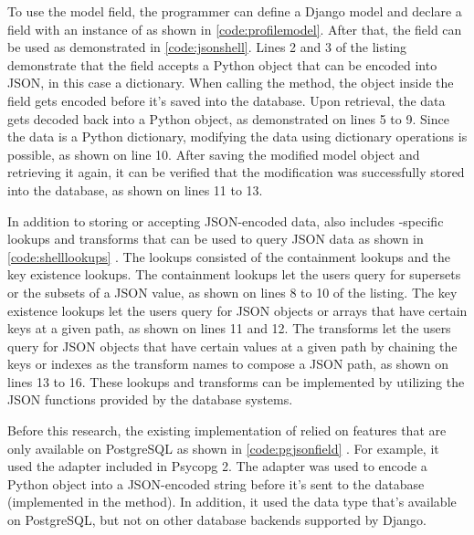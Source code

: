 To use the  model field, the programmer can define a Django
model and declare a field with an instance of  as shown in
\autoref{code:profilemodel}. After that, the field can be used as demonstrated
in \autoref{code:jsonshell}. Lines 2 and 3 of the listing demonstrate that the
field accepts a Python object that can be encoded into JSON, in this case a
dictionary. When calling the  method, the object inside the
field gets encoded before it's saved into the database. Upon retrieval, the
data gets decoded back into a Python object, as demonstrated on lines 5 to 9.
Since the data is a Python dictionary, modifying the data using dictionary
operations is possible, as shown on line 10. After saving the modified model
object and retrieving it again, it can be verified that the modification was
successfully stored into the database, as shown on lines 11 to 13.

\noindent
\begin{minipage}{\linewidth}

\end{minipage}

In addition to storing or accepting JSON-encoded data,  also
includes -specific lookups and transforms that can be used to
query JSON data as shown in \autoref{code:shelllookups}
\cite{django30_modeljsonfield}. The lookups consisted of the containment
lookups and the key existence lookups. The containment lookups let the users
query for supersets or the subsets of a JSON value, as shown on lines 8 to 10
of the listing. The key existence lookups let the users query for JSON objects
or arrays that have certain keys at a given path, as shown on lines 11 and 12.
The transforms let the users query for JSON objects that have certain values at
a given path by chaining the keys or indexes as the transform names to compose
a JSON path, as shown on lines 13 to 16. These lookups and transforms can be
implemented by utilizing the JSON functions provided by the database systems.

\noindent
\begin{minipage}{\linewidth}

\end{minipage}

Before this research, the existing implementation of  relied on
features that are only available on PostgreSQL as shown in
\autoref{code:pgjsonfield} \cite{django:pgjsonfield}. For example, it used the
 adapter included in Psycopg 2. The adapter was used to encode a
Python object into a JSON-encoded string before it's sent to the database
(implemented in the  method). In addition, it used the
 data type that's available on PostgreSQL, but not on other
database backends supported by Django.

